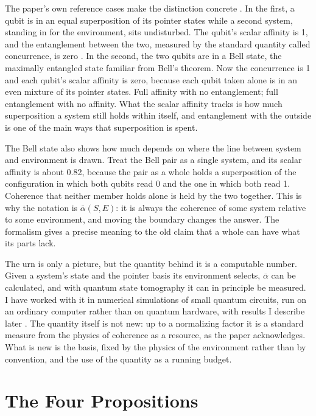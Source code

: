 The paper's own reference cases make the distinction concrete \citep{AdamsRCT}. In the first, a qubit is in an equal superposition of its pointer states while a second system, standing in for the environment, sits undisturbed. The qubit's scalar affinity is 1, and the entanglement between the two, measured by the standard quantity called concurrence, is zero \citep{Wootters1998}. In the second, the two qubits are in a Bell state, the maximally entangled state familiar from Bell's theorem. Now the concurrence is 1 and each qubit's scalar affinity is zero, because each qubit taken alone is in an even mixture of its pointer states. Full affinity with no entanglement; full entanglement with no affinity. What the scalar affinity tracks is how much superposition a system still holds within itself, and entanglement with the outside is one of the main ways that superposition is spent.

The Bell state also shows how much depends on where the line between system and environment is drawn. Treat the Bell pair as a single system, and its scalar affinity is about 0.82, because the pair as a whole holds a superposition of the configuration in which both qubits read 0 and the one in which both read 1. Coherence that neither member holds alone is held by the two together. This is why the notation is $\bar{\alpha}(S, E)$: it is always the coherence of some system relative to some environment, and moving the boundary changes the answer. The formalism gives a precise meaning to the old claim that a whole can have what its parts lack.

The urn is only a picture, but the quantity behind it is a computable number. Given a system's state and the pointer basis its environment selects, $\bar{\alpha}$ can be calculated, and with quantum state tomography it can in principle be measured. I have worked with it in numerical simulations of small quantum circuits, run on an ordinary computer rather than on quantum hardware, with results I describe later \citep{AdamsRCT}. The quantity itself is not new: up to a normalizing factor it is a standard measure from the physics of coherence as a resource, as the paper acknowledges. What is new is the basis, fixed by the physics of the environment rather than by convention, and the use of the quantity as a running budget.


\section{The Four Propositions}
\label{sec:ch13-propositions}

